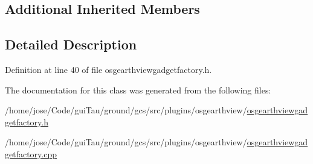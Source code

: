 \subsection*{Additional Inherited Members}


\subsection{Detailed Description}


Definition at line 40 of file osgearthviewgadgetfactory.\-h.



The documentation for this class was generated from the following files\-:\begin{DoxyCompactItemize}
\item 
/home/jose/\-Code/gui\-Tau/ground/gcs/src/plugins/osgearthview/\hyperlink{osgearthviewgadgetfactory_8h}{osgearthviewgadgetfactory.\-h}\item 
/home/jose/\-Code/gui\-Tau/ground/gcs/src/plugins/osgearthview/\hyperlink{osgearthviewgadgetfactory_8cpp}{osgearthviewgadgetfactory.\-cpp}\end{DoxyCompactItemize}
